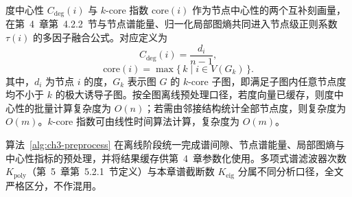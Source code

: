 度中心性 $C_{\text{deg}}(i)$ 与 $k$-core 指数 $\mathrm{core}(i)$\cite{BatageljZaversnik2003} 作为节点中心性的两个互补刻画量，在第~4~章第~4.2.2~节与节点谱能量、归一化局部图熵共同进入节点级正则系数 $\tau(i)$ 的多因子融合公式。对应定义为
\begin{equation}
  C_{\text{deg}}(i)
  =
  \frac{d_i}{n-1},
  \label{eq:ch3-degcent}
\end{equation}
\begin{equation}
  \mathrm{core}(i)
  =
  \max \{\, k \mid i \in V(G_k) \,\}.
  \label{eq:ch3-kcore}
\end{equation}
其中，$d_i$ 为节点 $i$ 的度，$G_k$ 表示图 $G$ 的 $k$-core 子图，即满足子图内任意节点度均不小于 $k$ 的极大诱导子图。按全图离线预处理口径，若度向量已缓存，则度中心性的批量计算复杂度为 $O(n)$；若需由邻接结构统计全部节点度，则复杂度为 $O(m)$。$k$-core 指数可由线性时间算法计算，复杂度为 $O(m)$。

算法~\ref{alg:ch3-preprocess} 在离线阶段统一完成谱间隙、节点谱能量、局部图熵与中心性指标的预处理，并将结果缓存供第~4~章参数化使用。多项式谱滤波器次数 $K_{\text{poly}}$（第~5~章第~5.2.1~节定义）与本章谱截断数 $K_{\text{eig}}$ 分属不同分析口径，全文严格区分，不作混用。



